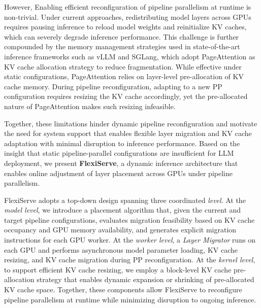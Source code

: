 \documentclass[sigplan,screen]{acmart}
\begin{document}
However, Enabling efficient reconfiguration of pipeline parallelism at runtime is non-trivial. Under current approaches, redistributing model layers across GPUs requires pausing inference to reload model weights and reinitialize KV caches, which can severely degrade inference performance. This challenge is further compounded by the memory management strategies used in state-of-the-art inference frameworks such as vLLM and SGLang, which adopt PageAttention as KV cache allocation strategy to reduce fragmentation. While effective under static configurations, PageAttention relies on layer-level pre-allocation of KV cache memory. During pipeline reconfiguration, adapting to a new PP configuration requires resizing the KV cache accordingly, yet the pre-allocated nature of PageAttention makes such resizing infeasible. 

Together, these limitations hinder dynamic pipeline reconfiguration and motivate the need for system support that enables flexible layer migration and KV cache adaptation with minimal disruption to inference performance. Based on the insight that static pipeline-parallel configurations are insufficient for LLM deployment, we present \textbf{FlexiServe}, a dynamic inference architecture that enables online adjustment of layer placement across GPUs under pipeline parallelism. 

FlexiServe adopts a top-down design spanning three coordinated \emph{level}. At the \emph{model level}, we introduce a placement algorithm that, given the current and target pipeline configurations, evaluates migration feasibility based on KV cache occupancy and GPU memory availability, and generates explicit migration instructions for each GPU worker. At the \emph{worker level}, a \emph{Layer Migrator} runs on each GPU and performs asynchronous model parameter loading, KV cache resizing, and KV cache migration during PP reconfiguration. At the \emph{kernel level}, to support efficient KV cache resizing, we employ a block-level KV cache pre-allocation strategy that enables dynamic expansion or shrinking of pre-allocated KV cache space. Together, these components allow FlexiServe to reconfigure pipeline parallelism at runtime while minimizing disruption to ongoing inference.
\end{document}
